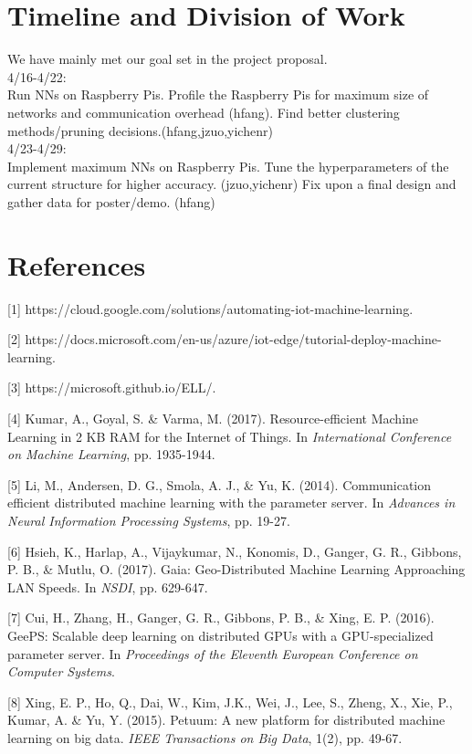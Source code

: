 \documentclass{article}
\begin{document}
\section{Timeline and Division of Work }
We have mainly met our goal set in the project proposal.\\
4/16-4/22:\\
Run NNs on Raspberry Pis. Profile the Raspberry Pis for maximum size of networks and communication overhead (hfang). Find better clustering methods/pruning decisions.(hfang,jzuo,yichenr)\\
4/23-4/29:\\
Implement maximum NNs on Raspberry Pis. Tune the hyperparameters of the current structure for higher accuracy. (jzuo,yichenr) Fix upon a final design and gather data for poster/demo. (hfang)



\newpage
\section*{References}

\medskip

\small

[1] https://cloud.google.com/solutions/automating-iot-machine-learning.

[2] https://docs.microsoft.com/en-us/azure/iot-edge/tutorial-deploy-machine-learning.

[3] https://microsoft.github.io/ELL/.

[4] Kumar, A., Goyal, S. \& Varma, M. (2017). Resource-efficient Machine Learning in 2 KB RAM for the Internet of Things. In {\it International Conference on Machine Learning}, pp. 1935-1944.

[5] Li, M., Andersen, D. G., Smola, A. J., \& Yu, K. (2014). Communication efficient distributed machine learning with the parameter server. In {\it Advances in Neural Information Processing Systems}, pp. 19-27.

[6] Hsieh, K., Harlap, A., Vijaykumar, N., Konomis, D., Ganger, G. R., Gibbons, P. B., \& Mutlu, O. (2017). Gaia: Geo-Distributed Machine Learning Approaching LAN Speeds. In {\it NSDI}, pp. 629-647.

[7] Cui, H., Zhang, H., Ganger, G. R., Gibbons, P. B., \& Xing, E. P. (2016). GeePS: Scalable deep learning on distributed GPUs with a GPU-specialized parameter server. In {\it Proceedings of the Eleventh European Conference on Computer Systems}.

[8] Xing, E. P., Ho, Q., Dai, W., Kim, J.K., Wei, J., Lee, S., Zheng, X., Xie, P., Kumar, A. \& Yu, Y. (2015). Petuum: A new platform for distributed machine learning on big data. {\it IEEE Transactions on Big Data}, 1(2), pp. 49-67.
\end{document}
